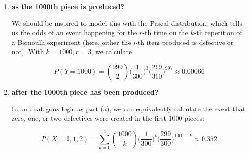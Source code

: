 \documentclass[10pt, oneside]{article}   	%
\theoremstyle{definition}
\begin{document}
\begin{enumerate}[label=9.\arabic*]
\begin{enumerate}
	\item  \begin{tcolorbox}[
	  colback=Cerulean!5!white,
	  colframe=Cerulean!75!black]
	\textbf{as the 1000th piece is produced?}
	\end{tcolorbox}
	
	We should be inspired to model this with the Pascal distribution, which tells us the odds of an event happening for the $r$-th time on the $k$-th repetition of a Bernoulli experiment (here, either the $i$-th item produced is defective or not). With $k = 1000, r = 3$, we calculate
	
	\[ P(Y = 1000) = \binom{999}{2} \bigg( \frac{1}{300} \bigg)^3 \bigg( \frac{299}{300} \bigg)^{997} \approx \boxed{0.00066} \]
	
	\item  \begin{tcolorbox}[
	  colback=Cerulean!5!white,
	  colframe=Cerulean!75!black]
	\textbf{after the 1000th piece has been produced?}
	\end{tcolorbox}
	
	In an analogous logic as part (a), we can equivalently calculate the event that zero, one, or two defectives were created in the first 1000 pieces:
	
	\[ P(X = 0, 1, 2) = \sum^2_{k = 0} \binom{1000}{k} \bigg( \frac{1}{300} \bigg)^k \bigg( \frac{299}{300} \bigg)^{1000-k} \approx \boxed{0.352} \]
	\end{enumerate}

\end{enumerate}
\end{document}

